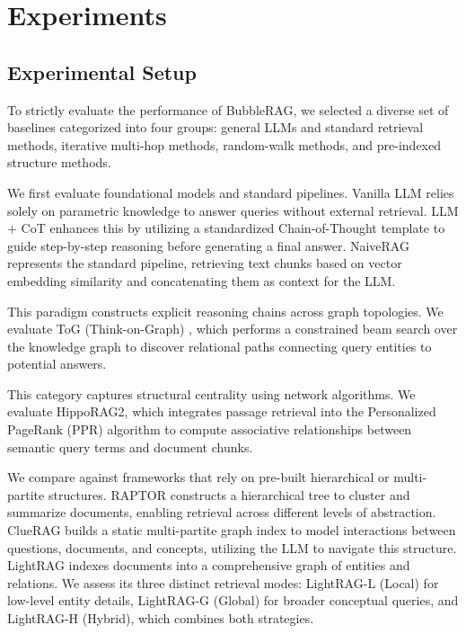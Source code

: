 
\section{Experiments}



\subsection{Experimental Setup}

To strictly evaluate the performance of BubbleRAG, we selected a diverse set of baselines categorized into four groups: general LLMs and standard retrieval methods, iterative multi-hop methods, random-walk methods, and pre-indexed structure methods.

 We first evaluate foundational models and standard pipelines. Vanilla LLM relies solely on parametric knowledge to answer queries without external retrieval. LLM + CoT\cite{2023-chainofthought} enhances this by utilizing a standardized Chain-of-Thought template to guide step-by-step reasoning before generating a final answer. NaiveRAG\cite{2024-surveyretrievalaugmentedgenerationl} represents the standard pipeline, retrieving text chunks based on vector embedding similarity and concatenating them as context for the LLM.

 This paradigm constructs explicit reasoning chains across graph topologies. We evaluate ToG (Think-on-Graph) \cite{2024-thinkongraph}, which performs a constrained beam search over the knowledge graph to discover relational paths connecting query entities to potential answers.


 This category captures structural centrality using network algorithms. We evaluate HippoRAG2\cite{2025-ragmemory}, which integrates passage retrieval into the Personalized PageRank (PPR) algorithm \cite{1999-pagerank} to compute associative relationships between semantic query terms and document chunks.


 We compare against frameworks that rely on pre-built hierarchical or multi-partite structures. RAPTOR \cite{2024-raptor} constructs a hierarchical tree to cluster and summarize documents, enabling retrieval across different levels of abstraction. ClueRAG builds a static multi-partite graph index to model interactions between questions, documents, and concepts, utilizing the LLM to navigate this structure. LightRAG \cite{2025-lightrag} indexes documents into a comprehensive graph of entities and relations. We assess its three distinct retrieval modes: LightRAG-L (Local) for low-level entity details, LightRAG-G (Global) for broader conceptual queries, and LightRAG-H (Hybrid), which combines both strategies.



